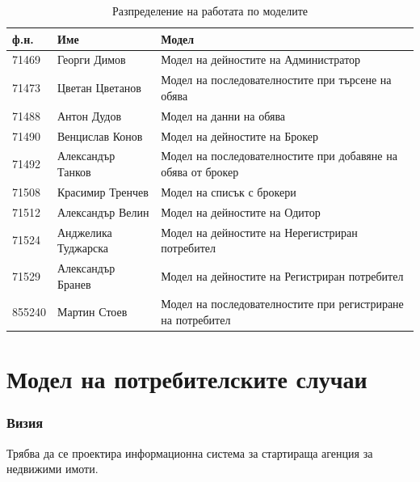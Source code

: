 \documentclass[a4paper]{article}
\begin{document}
\begin{table}[h]
\centering
\caption{Разпределение на работата по моделите}
\label{my-label}
\begin{tabular}{|l|l|l|}
\hline
\textbf{ф.н.} & \textbf{Име}        & \textbf{Модел}                                               \\ \hline
71469         & Георги Димов        & Модел на дейностите на Администратор                         \\ \hline
71473         & Цветан Цветанов     & Модел на последователностите при търсене на обява            \\ \hline
71488         & Антон Дудов         & Модел на данни на обява                                      \\ \hline
71490         & Венцислав Конов     & Модел на дейностите на Брокер                                \\ \hline
71492         & Александър Танков   & Модел на последователностите при добавяне на обява от брокер \\ \hline
71508         & Красимир Тренчев    & Модел на списък с брокери                                    \\ \hline
71512         & Александър Велин    & Модел на дейностите на Одитор                                \\ \hline
71524         & Анджелика Туджарска & Модел на дейностите на Нерегистриран потребител              \\ \hline
71529         & Александър Бранев   & Модел на дейностите на Регистриран потребител			       \\ \hline
855240        & Мартин Стоев        & Модел на последователностите при регистриране на потребител  \\ \hline
\end{tabular}
\end{table}

\clearpage



\part{Модел на потребителските случаи} \label{uc}
\setcounter{section}{0}

\section{Визия} \label{vision}

Трябва да се проектира информационна система за стартираща агенция за недвижими имоти. 
\end{document}
